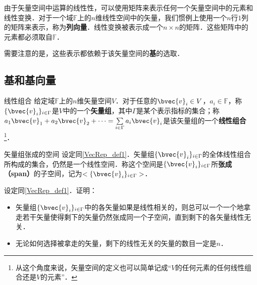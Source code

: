 
\begin{issues}
\end{issues}



由于矢量空间中运算的线性性，可以使用矩阵来表示任何一个矢量空间中的元素和线性变换．对于一个域$\mathbb{F}$上的$n$维线性空间中的矢量，我们惯例上使用一个$n$行$1$列的矩阵来表示，称为\textbf{列向量}．线性变换被表示成一个$n\times n$的矩阵．这些矩阵中的元素都必须取自$\mathbb{F}$．

需要注意的是，这些表示都依赖于该矢量空间的\textbf{基}的选取．

\subsection{基和基向量}

\begin{definition}{线性组合}\label{VecRep_def1}
给定域$\mathbb{F}$上的$n$维矢量空间$V$．对于任意的$\bvec{v}_i\in V$，$a_i\in\mathbb{F}$，称$\{\bvec{v}_i\}_{i\in\Gamma}$是$V$中的一个\textbf{矢量组}，其中$\Gamma$是某个表示指标的集合；称$a_1\bvec{v}_1+a_2\bvec{v}_2+\cdots=\sum\limits_{i\in\Gamma}a_i\bvec{v}_i$是该矢量组的一个\textbf{线性组合}\footnote{从这个角度来说，矢量空间的定义也可以简单记成“$V$的任何元素的任何线性组合还是$V$的元素”．}．
\end{definition}

\begin{definition}{矢量组张成的空间}
设定同\autoref{VecRep_def1}．矢量组$\{\bvec{v}_i\}_{i\in\Gamma}$的全体线性组合所构成的集合，仍然是一个线性空间．称这个空间是$\{\bvec{v}_i\}_{i\in\Gamma}$所\textbf{张成（span）}的子空间，记为$<\{\bvec{v}_i\}_{i\in\Gamma}>$．
\end{definition}

\begin{exercise}{}
设定同\autoref{VecRep_def1}．证明：
\begin{itemize}
\item 矢量组$\{\bvec{v}_i\}_{i\in\Gamma}$中的各矢量如果是线性相关的，则总可以一个一个地拿走若干矢量使得剩下的矢量仍然张成同一个子空间，直到剩下的各矢量线性无关．
\item 无论如何选择被拿走的矢量，剩下的线性无关的矢量的数目一定是$n$．
\end{itemize}
\end{exercise}

